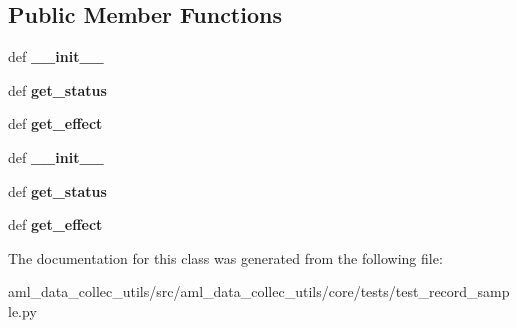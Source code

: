 \subsection*{Public Member Functions}
\begin{DoxyCompactItemize}
\item 
\hypertarget{classtest__record__sample_1_1_dummy_task_interface_acdda03f83e4234269fe967cde5090548}{def {\bfseries \-\_\-\-\_\-init\-\_\-\-\_\-}}\label{classtest__record__sample_1_1_dummy_task_interface_acdda03f83e4234269fe967cde5090548}

\item 
\hypertarget{classtest__record__sample_1_1_dummy_task_interface_a9b3dbd2c5d7382405d363d6dec479878}{def {\bfseries get\-\_\-status}}\label{classtest__record__sample_1_1_dummy_task_interface_a9b3dbd2c5d7382405d363d6dec479878}

\item 
\hypertarget{classtest__record__sample_1_1_dummy_task_interface_acc478a3d74f5c00a6538475a081af102}{def {\bfseries get\-\_\-effect}}\label{classtest__record__sample_1_1_dummy_task_interface_acc478a3d74f5c00a6538475a081af102}

\item 
\hypertarget{classtest__record__sample_1_1_dummy_task_interface_acdda03f83e4234269fe967cde5090548}{def {\bfseries \-\_\-\-\_\-init\-\_\-\-\_\-}}\label{classtest__record__sample_1_1_dummy_task_interface_acdda03f83e4234269fe967cde5090548}

\item 
\hypertarget{classtest__record__sample_1_1_dummy_task_interface_a9b3dbd2c5d7382405d363d6dec479878}{def {\bfseries get\-\_\-status}}\label{classtest__record__sample_1_1_dummy_task_interface_a9b3dbd2c5d7382405d363d6dec479878}

\item 
\hypertarget{classtest__record__sample_1_1_dummy_task_interface_acc478a3d74f5c00a6538475a081af102}{def {\bfseries get\-\_\-effect}}\label{classtest__record__sample_1_1_dummy_task_interface_acc478a3d74f5c00a6538475a081af102}

\end{DoxyCompactItemize}


The documentation for this class was generated from the following file\-:\begin{DoxyCompactItemize}
\item 
aml\-\_\-data\-\_\-collec\-\_\-utils/src/aml\-\_\-data\-\_\-collec\-\_\-utils/core/tests/test\-\_\-record\-\_\-sample.\-py\end{DoxyCompactItemize}
